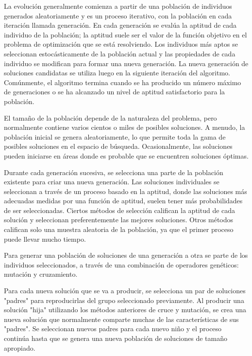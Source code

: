 La evolución generalmente comienza a partir de una población de individuos generados aleatoriamente y es un proceso iterativo, con la población en cada iteración llamada generación. En cada generación se evalúa la aptitud de cada individuo de la población; la aptitud suele ser el valor de la función objetivo en el problema de optimización que se está resolviendo. Los individuos más aptos se seleccionan estocásticamente de la población actual y las propiedades de cada individuo se modifican para formar una nueva generación. La nueva generación de soluciones candidatas se utiliza luego en la siguiente iteración del algoritmo. Comúnmente, el algoritmo termina cuando se ha producido un número máximo de generaciones o se ha alcanzado un nivel de aptitud satisfactorio para la población.

El tamaño de la población depende de la naturaleza del problema, pero normalmente contiene varios cientos o miles de posibles soluciones. A menudo, la población inicial se genera aleatoriamente, lo que permite toda la gama de posibles soluciones en el espacio de búsqueda. Ocasionalmente, las soluciones pueden iniciarse en áreas donde es probable que se encuentren soluciones óptimas.

Durante cada generación sucesiva, se selecciona una parte de la población existente para criar una nueva generación. Las soluciones individuales se seleccionan a través de un proceso basado en la aptitud, donde las soluciones más adecuadas medidas por una función de aptitud, suelen tener más probabilidades de ser seleccionadas. Ciertos métodos de selección califican la aptitud de cada solución y seleccionan preferentemente las mejores soluciones. Otros métodos califican solo una muestra aleatoria de la población, ya que el primer proceso puede llevar mucho tiempo.

Para generar una población de soluciones de una generación a otra se parte de los individuos seleccionados, a través de una combinación de operadores genéticos: mutación y cruzamiento.

Para cada nueva solución que se va a producir, se selecciona un par de soluciones "padres" para reproducirlas del grupo seleccionado previamente. Al producir una solución "hija" utilizando los métodos anteriores de cruce y mutación, se crea una nueva solución que normalmente comparte muchas de las características de sus "padres". Se seleccionan nuevos padres para cada nuevo niño y el proceso continúa hasta que se genera una nueva población de soluciones de tamaño apropiado.

